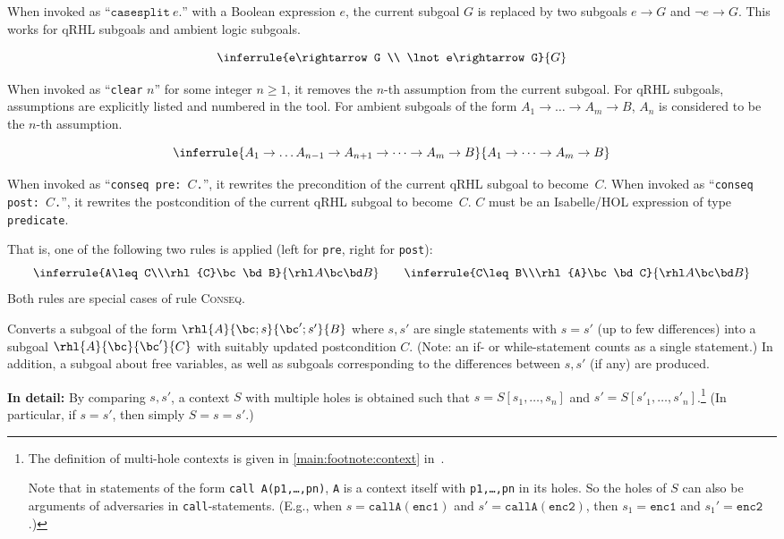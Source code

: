 \documentclass{article}
\newcommand\qrhlautoref[1]{\autoref*{main:#1} in~\cite{qrhl-paper-from-manual}}
\renewcommand\ruleref[1]{rule \hbox{\textsc{#1}}}
\begin{document}

When invoked as ``$\mathtt{casesplit}\ e\mathtt{.}$''
with a Boolean expression $e$,
the current subgoal $G$
is replaced by two subgoals $e\rightarrow G$
and $\lnot e\rightarrow G$.
This works for qRHL subgoals and ambient logic subgoals.

\[
  \inferrule
  {e\rightarrow G
    \\
    \lnot e\rightarrow G}
  {G}
\]


When invoked as ``\texttt{clear} $n$''
for some integer $n\geq 1$,
it removes the $n$-th
assumption from the current subgoal. For qRHL subgoals, assumptions
are explicitly listed and numbered in the tool. For ambient subgoals of the form
$A_1\to \dots \to A_m\to B$,
$A_n$ is considered to be the $n$-th assumption.

\[
  \inferrule
  {A_1\to \dots A_{n-1}\to A_{n+1}\to\dots \to A_m\to B}
  {A_1\to \dots \to A_m\to B}
\]




When invoked as ``\texttt{conseq pre: $C$.}'',
it rewrites the precondition of the current qRHL subgoal to become~$C$.
When invoked as ``\texttt{conseq post: $C$.}'',
it rewrites the postcondition of the current qRHL subgoal to become~$C$.
$C$ must be an Isabelle/HOL expression of type \texttt{predicate}.

That is, one of the following two rules is applied (left for
\texttt{pre}, right for \texttt{post}):
\[
  \inferrule{A\leq C\\\rhl{C}\bc\bd B}{\rhl A\bc\bd B}
  \qquad
  \inferrule{C\leq B\\\rhl{A}\bc\bd C}{\rhl A\bc\bd B}
\]
%
Both rules are special cases of \ruleref{Conseq}.




Converts a subgoal of the form
$\rhl{A}{\bc;s}{\bc';s'}{B}$
where $s,s'$ are single statements with $s=s'$ (up to few differences)
into a subgoal $\rhl{A}{\bc}{\bc'}{C}$
with suitably updated postcondition $C$.
(Note: an if- or while-statement counts as a single statement.)
In addition, a subgoal about free variables,
as well as subgoals corresponding to the differences between $s,s'$ (if any) are produced.

\textbf{In detail:}
By comparing $s,s'$, a context $S$ with multiple holes is obtained
such that $s=S[s_1,\dots,s_n]$ and $s'=S[s'_1,\dots,s'_n]$.\footnote{%
  The definition of multi-hole contexts is given in \qrhlautoref{footnote:context}.
  
  Note that in statements of the form \texttt{call A(p1,\dots,pn)},
  \texttt{A} is a context itself with \texttt{p1,\dots,pn} in its holes.
  So the holes of $S$ can also be arguments of adversaries in \texttt{call}-statements.
  (E.g., when $s=\mathtt{call A(enc1)}$ and $s'=\mathtt{call A(enc2)}$,
  then $s_1=\mathtt{enc1}$ and $s_1'=\mathtt{enc2}$.)
}
(In particular, if $s=s'$, then simply $S=s=s'$.)
\end{document}
